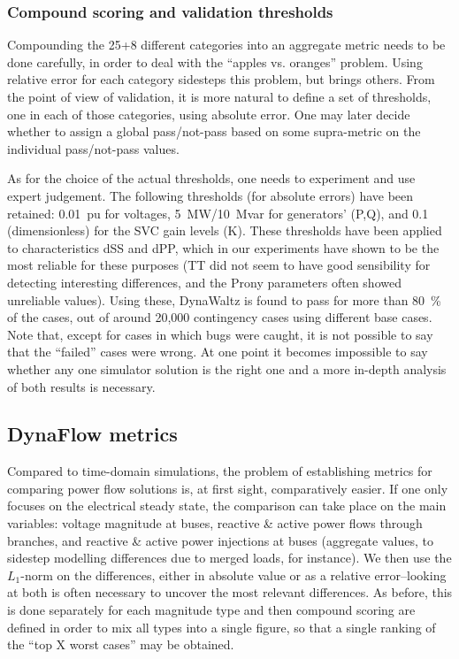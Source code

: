 \documentclass[conference]{IEEEtran}
\begin{document}
\subsubsection{Compound scoring and validation thresholds}

Compounding the 25+8 different categories into an aggregate metric needs to be
done carefully, in order to deal with the ``apples vs. oranges'' problem. Using
relative error for each category sidesteps this problem, but brings others.
From the point of view of validation, it is more natural to define a set of
thresholds, one in each of those categories, using absolute error. One may later
decide whether to assign a global pass/not-pass based on some supra-metric on
the individual pass/not-pass values.


As for the choice of the actual thresholds, one needs to experiment and use
expert judgement. The following thresholds (for absolute errors) have been
retained: \SI{0.01}{pu} for voltages, \SI{5}{MW}/\SI{10}{Mvar} for generators'
(P,Q), and 0.1 (dimensionless) for the SVC gain levels (K). These thresholds
have been applied to characteristics dSS and dPP, which in our experiments have
shown to be the most reliable for these purposes (TT did not seem to have good
sensibility for detecting interesting differences, and the Prony parameters
often showed unreliable values).  Using these, DynaWaltz is found to pass for
more than \SI{80}{\%} of the cases, out of around 20,000 contingency cases using
different base cases.  Note that, except for cases in which bugs were caught, it
is not possible to say that the ``failed'' cases were wrong.  At one point it
becomes impossible to say whether any one simulator solution is the right one
and a more in-depth analysis of both results is necessary.



\subsection{DynaFlow metrics}

Compared to time-domain simulations, the problem of establishing metrics for
comparing power flow solutions is, at first sight, comparatively easier. If one
only focuses on the electrical steady state, the comparison can take place on
the main variables: voltage magnitude at buses, reactive \& active power flows
through branches, and reactive \& active power injections at buses (aggregate
values, to sidestep modelling differences due to merged loads, for instance). We
then use the $L_1$-norm on the differences, either in absolute value or as a
relative error--looking at both is often necessary to uncover the most relevant
differences. As before, this is done separately for each magnitude type and then compound scoring are defined in order to mix all types into a single figure, so
that a single ranking of the ``top X worst cases'' may be obtained.
\end{document}
